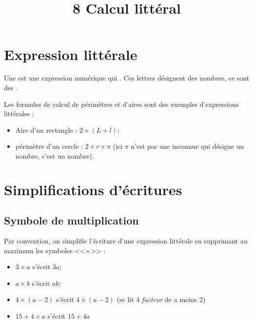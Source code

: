 \documentclass[12pt,a4paper]{article}
\date{}
\title{\textcircled{{\normalsize{8}}} Calcul littéral}
\begin{document}








\section{Expression littérale}


\begin{mydef}
	Une  est une expression numérique qui . Ces lettres désignent des nombres, ce sont des .
\end{mydef}

\begin{myexs}
	Les formules de calcul de périmètres et d'aires sont des exemples d'expressions littérales :
	\begin{itemize}
		\item Aire d'un rectangle : $2 \times (L + l)$;
		\item périmètre d'un cercle : $2 \times r \times \pi$ (ici $\pi$ n'est pas une inconnue qui désigne un nombre, c'est un nombre).
	\end{itemize}
\end{myexs}

\section{Simplifications d'écritures}

\subsection{Symbole de multiplication}
\begin{mymeth}
	Par convention, on simplifie l'écriture d'une expression littérale en supprimant au maximum les symboles <<$\times$>> :
	\begin{itemize}
		\item $3 \times a $ s'écrit $3a$;
		\item $a \times b $ s'écrit $ab$;
		\item $4 \times (a - 2)$ s'écrit $4 \times (a - 2)$ (se lit 4 \textit{facteur} de a moins 2)
		\item $15 + 4 \times a$ s'écrit $15 + 4a$
	\end{itemize}
\end{mymeth}
\end{document}
